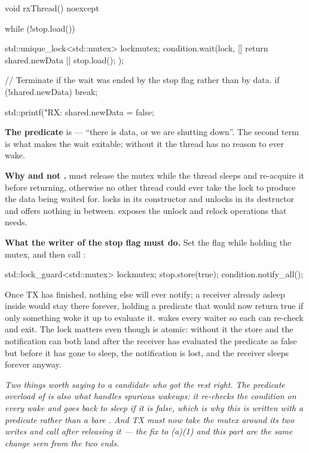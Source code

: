 \begin{cppcode}
void rxThread() noexcept
{
    while (!stop.load())
    {
        std::unique_lock<std::mutex> lock{mutex};
        condition.wait(lock, [] { return shared.newData || stop.load(); });

        // Terminate if the wait was ended by the stop flag rather than by data.
        if (!shared.newData) { break; }

        std::printf("RX: %
        shared.newData = false;
    }
}
\end{cppcode}

\textbf{The predicate} is  --- ``there is data, or we are
shutting down''. The second term is what makes the wait exitable; without it the thread has no
reason to ever wake.

\textbf{Why  and not .}  must release the
mutex while the thread sleeps and re-acquire it before returning, otherwise no other thread could
ever take the lock to produce the data being waited for.  locks in its
constructor and unlocks in its destructor and offers nothing in between. 
exposes the unlock and relock operations that  needs. 

\textbf{What the writer of the stop flag must do.} Set the flag while holding the mutex, and then
call :

\begin{cppcode}
{
    std::lock_guard<std::mutex> lock{mutex};
    stop.store(true);
}
condition.notify_all();
\end{cppcode}

\noindent Once TX has finished, nothing else will ever notify; a receiver already asleep inside
 would stay there forever, holding a predicate that would now return true if only
something woke it up to evaluate it.  wakes every waiter so each can re-check and
exit. The lock matters even though  is atomic: without it the store and the notification
can both land after the receiver has evaluated the predicate as false but before it has gone to
sleep, the notification is lost, and the receiver sleeps forever anyway. 

\textit{Two things worth saying to a candidate who got the rest right. The predicate overload of
 is also what handles spurious wakeups: it re-checks the condition on every wake and
goes back to sleep if it is false, which is why this is written with a predicate rather than a bare
. And TX must now take the mutex around its two writes and call
 after releasing it --- the fix to (a)(1) and this part are the same change seen
from the two ends.}
